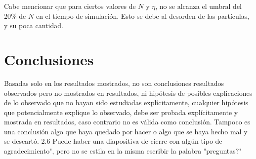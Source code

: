 \documentclass[11pt, a4paper]{article}
\begin{document}
            Cabe mencionar que para ciertos valores de $N$ y $\eta$, no se alcanza el umbral del 20\% de $N$ en el tiempo de simulación.
            Esto se debe al desorden de las partículas, y su poca cantidad.

    \section{Conclusiones}

        Basadas solo en los resultados mostrados, no son conclusiones
        resultados observados pero no mostrados en resultados, ni hipótesis de posibles explicaciones de
        lo observado que no hayan sido estudiadas explícitamente, cualquier hipótesis que
        potencialmente explique lo observado, debe ser probada explícitamente y mostrada en resultados,
        caso contrario no es válida como conclusión. Tampoco es una conclusión algo que haya quedado
        por hacer o algo que se haya hecho mal y se descartó.
        2.6 Puede haber una diapositiva de cierre con algún tipo de agradecimiento", pero no se estila en
        la misma escribir la palabra "preguntas?"
\end{document}

